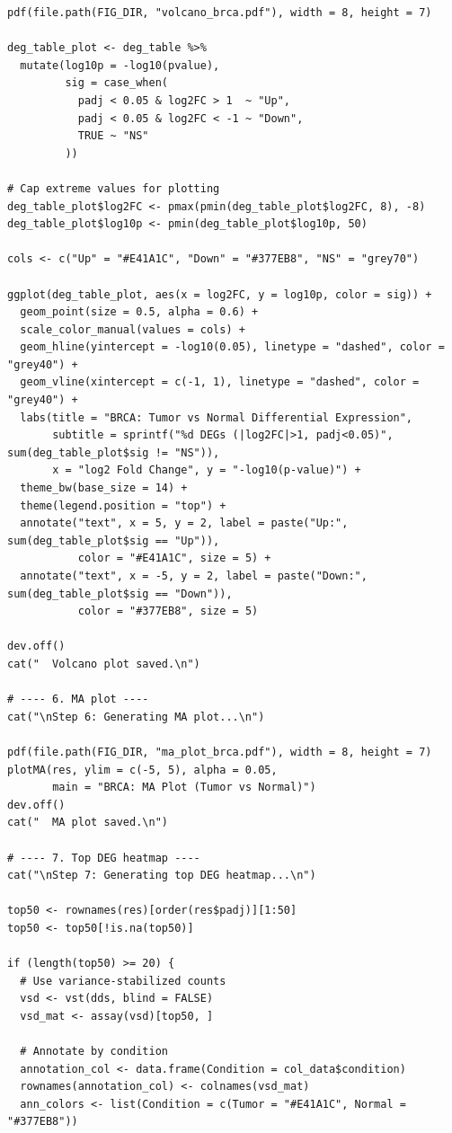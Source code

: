 \documentclass[12pt,a4paper]{ctexart}
\begin{document}
\begin{lstlisting}[caption={04_diff_expression}, basicstyle=\ttfamily\scriptsize]
pdf(file.path(FIG_DIR, "volcano_brca.pdf"), width = 8, height = 7)

deg_table_plot <- deg_table %>%
  mutate(log10p = -log10(pvalue),
         sig = case_when(
           padj < 0.05 & log2FC > 1  ~ "Up",
           padj < 0.05 & log2FC < -1 ~ "Down",
           TRUE ~ "NS"
         ))

# Cap extreme values for plotting
deg_table_plot$log2FC <- pmax(pmin(deg_table_plot$log2FC, 8), -8)
deg_table_plot$log10p <- pmin(deg_table_plot$log10p, 50)

cols <- c("Up" = "#E41A1C", "Down" = "#377EB8", "NS" = "grey70")

ggplot(deg_table_plot, aes(x = log2FC, y = log10p, color = sig)) +
  geom_point(size = 0.5, alpha = 0.6) +
  scale_color_manual(values = cols) +
  geom_hline(yintercept = -log10(0.05), linetype = "dashed", color = "grey40") +
  geom_vline(xintercept = c(-1, 1), linetype = "dashed", color = "grey40") +
  labs(title = "BRCA: Tumor vs Normal Differential Expression",
       subtitle = sprintf("%d DEGs (|log2FC|>1, padj<0.05)", sum(deg_table_plot$sig != "NS")),
       x = "log2 Fold Change", y = "-log10(p-value)") +
  theme_bw(base_size = 14) +
  theme(legend.position = "top") +
  annotate("text", x = 5, y = 2, label = paste("Up:", sum(deg_table_plot$sig == "Up")),
           color = "#E41A1C", size = 5) +
  annotate("text", x = -5, y = 2, label = paste("Down:", sum(deg_table_plot$sig == "Down")),
           color = "#377EB8", size = 5)

dev.off()
cat("  Volcano plot saved.\n")

# ---- 6. MA plot ----
cat("\nStep 6: Generating MA plot...\n")

pdf(file.path(FIG_DIR, "ma_plot_brca.pdf"), width = 8, height = 7)
plotMA(res, ylim = c(-5, 5), alpha = 0.05,
       main = "BRCA: MA Plot (Tumor vs Normal)")
dev.off()
cat("  MA plot saved.\n")

# ---- 7. Top DEG heatmap ----
cat("\nStep 7: Generating top DEG heatmap...\n")

top50 <- rownames(res)[order(res$padj)][1:50]
top50 <- top50[!is.na(top50)]

if (length(top50) >= 20) {
  # Use variance-stabilized counts
  vsd <- vst(dds, blind = FALSE)
  vsd_mat <- assay(vsd)[top50, ]

  # Annotate by condition
  annotation_col <- data.frame(Condition = col_data$condition)
  rownames(annotation_col) <- colnames(vsd_mat)
  ann_colors <- list(Condition = c(Tumor = "#E41A1C", Normal = "#377EB8"))


\end{lstlisting}
\end{document}
